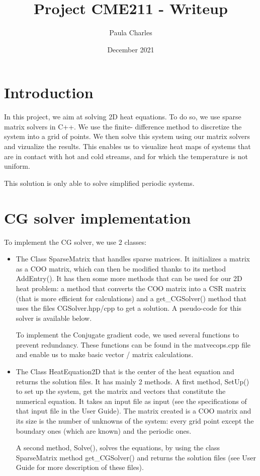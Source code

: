\documentclass{article}
\title{Project CME211 - Writeup}
\author{Paula Charles}
\date{December 2021}
\begin{document}
\maketitle

\section{Introduction}

In this project, we aim at solving 2D heat equations. To do 
so, we use sparse matrix solvers in C++. We use the finite-
difference method to discretize the system into a grid of 
points. We then solve this system using our matrix solvers 
and vizualize the results. This enables us to 
visualize heat maps of systems that are in contact with hot and 
cold streams, and for which the temperature is not uniform.

This solution is only able to solve simplified periodic systems.

\section{CG solver implementation}

To implement the CG solver, we use 2 classes:

\begin{itemize}
    \item The Class SparseMatrix that handles sparse matrices. 
    It initializes a matrix as a COO matrix, which can then be 
    modified thanks to its method AddEntry(). It has then some 
    more methods that can be used for our 2D heat problem: a 
    method that converts the COO matrix into a CSR matrix 
    (that is more efficient for calculations) and a 
    get\_CGSolver() method that uses the files CGSolver.hpp/cpp 
    to get a solution. A pseudo-code for this solver is available below.
    
    To implement the Conjugate gradient code, we used several 
    functions to prevent redundancy. These functions can be found
    in the matvecops.cpp file and enable us to 
    make basic vector / matrix calculations.
    
    \item The Class HeatEquation2D that is the center of the 
    heat equation and returns the solution files. It has mainly 
    2 methods. A first method, SetUp() to set up the system, 
    get the matrix and vectors that constitute the numerical 
    equation. It takes an input file as input (see the 
    specifications of that input file in the User
    Guide). The matrix created 
    is a COO matrix and its size is the number of unknowns of 
    the system: every grid point except the boundary ones (which 
    are known) and the periodic ones.
    
    A second method, Solve(), solves the equations, by using the 
    class SparseMatrix method get\_CGSolver()  and returns the 
    solution files (see User 
    Guide for more description of these files).
\end{itemize}
\end{document}
